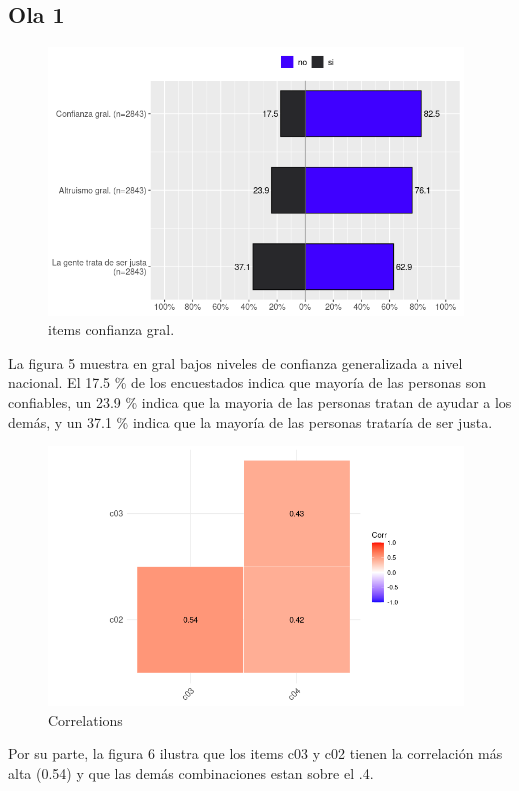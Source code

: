 \subsection{Ola 1}

\begin{figure}[H]
    \centering
    \includegraphics[width=11cm]{output/conf_fact1.png}
    \caption{items confianza gral.}
    \label{fig:conf1}
\end{figure}

La figura 5 muestra en gral bajos niveles de confianza generalizada a nivel nacional. El 17.5 \% de los encuestados indica que mayoría de las personas son confiables, un 23.9 \% indica que la mayoria de las personas tratan de ayudar a los demás, y un 37.1 \% indica que la mayoría de las personas trataría de ser justa. 


\begin{figure}[H]
    \centering
    \includegraphics[width=11cm]{output/corrplot1.png}
    \caption{Correlations}
    \label{fig:corr1}
\end{figure}

Por su parte, la figura 6 ilustra que los items c03 y c02 tienen la correlación más alta (0.54) y que las demás combinaciones estan sobre el .4. 

